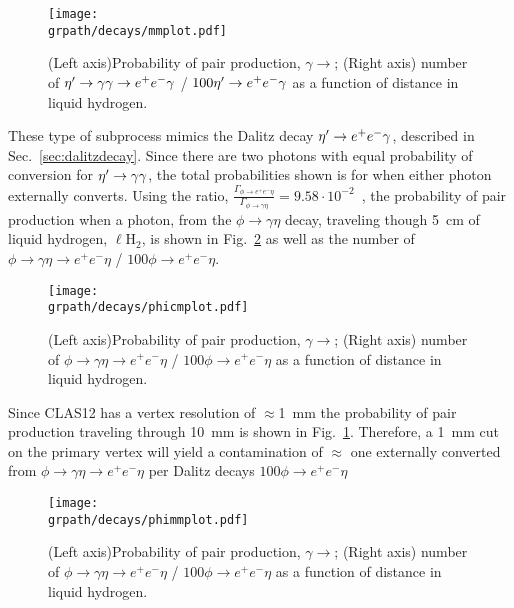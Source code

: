 \begin{figure}[h!]\begin{center}
	\texttt{[image: \\grpath/decays/mmplot.pdf]}
	\caption[Probability of pair production, $\gamma \to$\epemT, as a function of distance in liquid hydrogen]{\label{fig:conversionmm}{(Left axis)Probability of pair production, $\gamma \to$\epemT; (Right axis) number of $\eta^{\prime} \to \gamma \gamma \rightarrow e^+e^- \gamma$ / $100 \eta^{\prime} \rightarrow e^+e^- \gamma$ as a function of distance in liquid hydrogen.}}
\end{center}\end{figure}
These type of subprocess mimics the Dalitz decay  $\eta^{\prime} \to e^+e^- \gamma$, described in Sec.~\ref{sec:dalitzdecay}. Since there are two photons with equal probability of conversion for $\eta^{\prime} \to \gamma \gamma$, the total probabilities shown is for when either photon externally converts.
Using the ratio, $\frac{\Gamma_{\phi \to e^+e^- \eta}}{\Gamma_{\phi \to \gamma \eta}} = 9.58\cdot 10^{-2}$~\cite{pdg2014}, the probability of pair production when a photon, from the $\phi \to \gamma \eta$ decay, traveling though 5~cm of liquid hydrogen, $\ell$H$_2$, is shown in Fig.~\ref{fig:conversionphi} as well as the number of $\phi \to \gamma \eta \rightarrow e^+e^- \eta$ / $100 \phi \rightarrow e^+e^- \eta$. 
\begin{figure}[h!]\begin{center}
	\texttt{[image: \\grpath/decays/phicmplot.pdf]}
	\caption[Probability of pair production, $\gamma \to$\epemT, as a function of distance in liquid hydrogen]{\label{fig:conversionphi}{(Left axis)Probability of pair production, $\gamma \to$\epemT; (Right axis) number of $\phi \to \gamma \eta \rightarrow e^+e^- \eta$ / $100 \phi \rightarrow e^+e^- \eta$ as a function of distance in liquid hydrogen.}}
\end{center}\end{figure}
			Since CLAS12 has a vertex resolution of $\approx$1~mm the probability of pair production traveling through 10~mm is shown in Fig.~\ref{fig:conversionmm}. Therefore, a 1~mm cut on the primary vertex will yield a contamination of $\approx$ one externally converted \epemT from $\phi \to \gamma \eta \rightarrow e^+e^- \eta$ per Dalitz decays $100 \phi \rightarrow e^+e^- \eta$
\begin{figure}[h!]\begin{center}
	\texttt{[image: \\grpath/decays/phimmplot.pdf]}
	\caption[Probability of pair production, $\gamma \to$\epemT, as a function of distance in liquid hydrogen]{\label{fig:conversionphimm}{(Left axis)Probability of pair production, $\gamma \to$\epemT; (Right axis) number of $\phi \to \gamma \eta \rightarrow e^+e^- \eta$ / $100 \phi \rightarrow e^+e^- \eta$ as a function of distance in liquid hydrogen.}}
\end{center}\end{figure}
